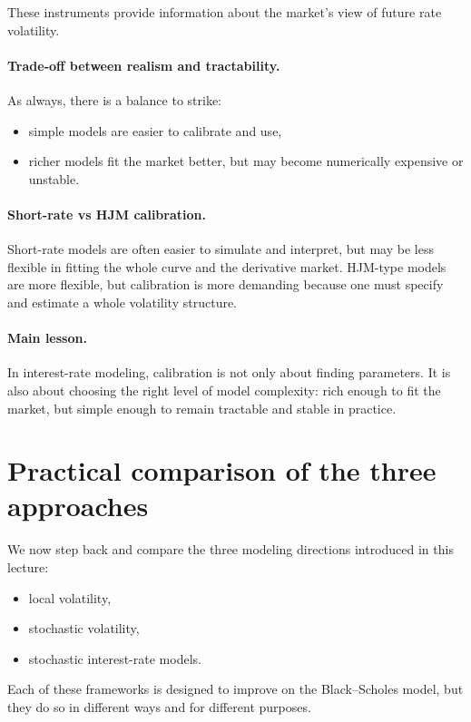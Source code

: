 \documentclass[11pt]{article}
\theoremstyle{plain}
\theoremstyle{definition}
\theoremstyle{remark}
\begin{document}
These instruments provide information about the market's view of future
rate volatility.

\paragraph{Trade-off between realism and tractability.}
As always, there is a balance to strike:
\begin{itemize}[leftmargin=1.4em]
    \item simple models are easier to calibrate and use,
    \item richer models fit the market better, but may become
    numerically expensive or unstable.
\end{itemize}

\paragraph{Short-rate vs HJM calibration.}
Short-rate models are often easier to simulate and interpret, but may be
less flexible in fitting the whole curve and the derivative market.
HJM-type models are more flexible, but calibration is more demanding
because one must specify and estimate a whole volatility structure.

\paragraph{Main lesson.}
In interest-rate modeling, calibration is not only about finding
parameters.
It is also about choosing the right level of model complexity:
rich enough to fit the market, but simple enough to remain tractable and
stable in practice.
\section{Practical comparison of the three approaches}

We now step back and compare the three modeling directions introduced in
this lecture:
\begin{itemize}[leftmargin=1.4em]
    \item local volatility,
    \item stochastic volatility,
    \item stochastic interest-rate models.
\end{itemize}

Each of these frameworks is designed to improve on the Black--Scholes
model, but they do so in different ways and for different purposes.
\end{document}
